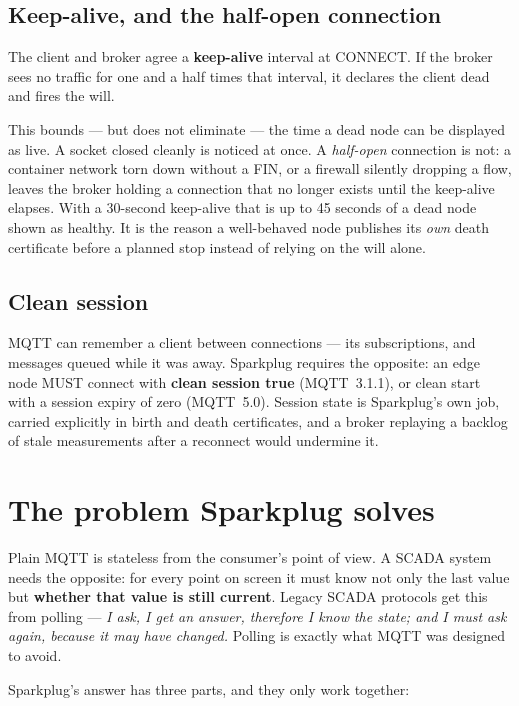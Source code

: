 \subsection{Keep-alive, and the half-open connection}

The client and broker agree a \textbf{keep-alive} interval at CONNECT. If the broker sees
no traffic for one and a half times that interval, it declares the client dead and fires
the will.

This bounds --- but does not eliminate --- the time a dead node can be displayed as live.
A socket closed cleanly is noticed at once. A \emph{half-open} connection is not: a
container network torn down without a FIN, or a firewall silently dropping a flow, leaves
the broker holding a connection that no longer exists until the keep-alive elapses. With a
30-second keep-alive that is up to 45 seconds of a dead node shown as healthy. It is the
reason a well-behaved node publishes its \emph{own} death certificate before a planned
stop instead of relying on the will alone.

\subsection{Clean session}

MQTT can remember a client between connections --- its subscriptions, and messages queued
while it was away. Sparkplug requires the opposite: an edge node MUST connect with
\textbf{clean session true} (MQTT~3.1.1), or clean start with a session expiry of zero
(MQTT~5.0). Session state is Sparkplug's own job, carried explicitly in birth and death
certificates, and a broker replaying a backlog of stale measurements after a reconnect
would undermine it.

\section{The problem Sparkplug solves}

Plain MQTT is stateless from the consumer's point of view. A SCADA system needs the
opposite: for every point on screen it must know not only the last value but
\textbf{whether that value is still current}. Legacy SCADA protocols get this from polling
--- \emph{I ask, I get an answer, therefore I know the state; and I must ask again,
because it may have changed.} Polling is exactly what MQTT was designed to avoid.

Sparkplug's answer has three parts, and they only work together:


